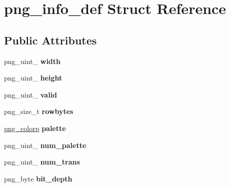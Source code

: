 \hypertarget{structpng__info__def}{\section{png\-\_\-info\-\_\-def Struct Reference}
\label{structpng__info__def}
}
\subsection*{Public Attributes}
\begin{DoxyCompactItemize}
\item 
\hypertarget{structpng__info__def_ac487ded925efc3985d1f6f873d2f2014}{png\-\_\-uint\-\_ {\bfseries width}}\label{structpng__info__def_ac487ded925efc3985d1f6f873d2f2014}

\item 
\hypertarget{structpng__info__def_ade3d79dce8b63cbfdd6150c4c30e51f4}{png\-\_\-uint\-\_ {\bfseries height}}\label{structpng__info__def_ade3d79dce8b63cbfdd6150c4c30e51f4}

\item 
\hypertarget{structpng__info__def_a8695fb4fae2b7d0c8a5be4f4c563aa8a}{png\-\_\-uint\-\_ {\bfseries valid}}\label{structpng__info__def_a8695fb4fae2b7d0c8a5be4f4c563aa8a}

\item 
\hypertarget{structpng__info__def_ad8db9ce83eb9f443fddd006a2d0d6589}{png\-\_\-size\-\_\-t {\bfseries rowbytes}}\label{structpng__info__def_ad8db9ce83eb9f443fddd006a2d0d6589}

\item 
\hypertarget{structpng__info__def_af032d4977f69766baf6ed147abc5ee27}{\hyperlink{structpng__color__struct}{png\-\_\-colorp} {\bfseries palette}}\label{structpng__info__def_af032d4977f69766baf6ed147abc5ee27}

\item 
\hypertarget{structpng__info__def_aa7b651d53768b70da1910bf750ddb341}{png\-\_\-uint\-\_ {\bfseries num\-\_\-palette}}\label{structpng__info__def_aa7b651d53768b70da1910bf750ddb341}

\item 
\hypertarget{structpng__info__def_ac088b6ab245f61f474ba56a66ec7e787}{png\-\_\-uint\-\_ {\bfseries num\-\_\-trans}}\label{structpng__info__def_ac088b6ab245f61f474ba56a66ec7e787}

\item 
\hypertarget{structpng__info__def_a437ea0466fea89c1794a8e3aa8d4da9e}{png\-\_\-byte {\bfseries bit\-\_\-depth}}\label{structpng__info__def_a437ea0466fea89c1794a8e3aa8d4da9e}


\end{DoxyCompactItemize}
